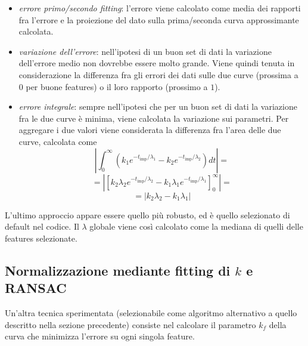 \documentclass[12pt]{report}
\begin{document}
\begin{itemize}
	\item	\emph{errore primo/secondo fitting}: l'errore viene calcolato come media dei rapporti fra l'errore e la proiezione del dato sulla prima/seconda curva approssimante calcolata.
	\item	\emph{variazione dell'errore}: nell'ipotesi di un buon set di dati la variazione dell'errore medio non dovrebbe essere molto grande. Viene quindi tenuta in considerazione la differenza fra gli errori dei dati sulle due curve (prossima a $0$ per buone features) o il loro rapporto (prossimo a $1$).
	\item	\emph{errore integrale}: sempre nell'ipotesi che per un buon set di dati la variazione fra le due curve \`e minima, viene calcolata la variazione sui parametri. Per aggregare i due valori viene considerata la differenza fra l'area delle due curve, calcolata come $$\left|\int^{\infty}_0\left(k_1e^{-t_{\text{imp}}/\lambda_1} - k_2e^{-t_{\text{imp}}/\lambda_2}\right)dt\right| =$$ $$= \left|\left[ k_2\lambda_2e^{-t_{\text{imp}}/\lambda_2} - k_1\lambda_1e^{-t_{\text{imp}}/\lambda_1} \right]^\infty_0\right| =$$ $$ = \left|k_2\lambda_2 - k_1\lambda_1\right|$$
\end{itemize}

\noindent L'ultimo approccio appare essere quello pi\`u robusto, ed \`e quello selezionato di default nel codice. Il $\lambda$ globale viene cos\`i calcolato come la mediana di quelli delle features selezionate.




\subsection{Normalizzazione mediante fitting di $k$ e RANSAC}
\label{sect:rans}

\noindent Un'altra tecnica sperimentata (selezionabile come algoritmo alternativo a quello descritto nella sezione precedente) consiste nel calcolare il parametro $k_f$ della curva che minimizza l'errore su ogni singola feature.\\
\end{document}

